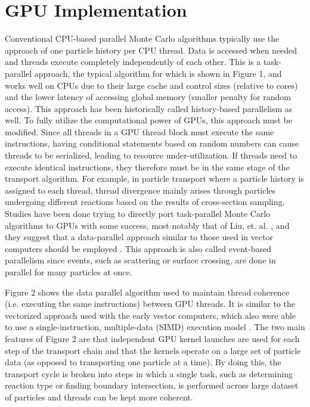 \chapter{GPU Implementation}
\label{chap:imp}

Conventional CPU-based parallel Monte Carlo algorithms typically use the approach of one particle history per CPU thread.  Data is accessed when needed and threads execute completely independently of each other.  This is a task-parallel approach, the typical algorithm for which is shown in Figure 1, and works well on CPUs due to their large cache and control sizes (relative to cores) and the lower latency of accessing global memory (smaller penalty for random access).  This approach has been historically called history-based parallelism as well.  To fully utilize the computational power of GPUs, this approach must be modified.  Since all threads in a GPU thread block must execute the same instructions, having conditional statements based on random numbers can cause threads to be serialized, leading to resource under-utilization.  If threads need to execute identical instructions, they therefore must be in the same stage of the transport algorithm.  For example, in particle transport where a particle history is assigned to each thread, thread divergence mainly arises through particles undergoing different reactions based on the results of cross-section sampling.    Studies have been done trying to directly port task-parallel Monte Carlo algorithms to GPUs with some success, most notably that of Liu, et. al. \cite{tianyu}, and they suggest that a data-parallel approach similar to those used in vector computers should be employed \cite{tianyu,vector}.  This approach is also called event-based parallelism since events, such as scattering or surface crossing, are done in parallel for many particles at once.  

Figure 2 shows the data parallel algorithm used to maintain thread coherence (i.e. executing the same instructions) between GPU threads.  It is similar to the vectorized approach used with the early vector computers, which also were able to use a single-instruction, multiple-data (SIMD) execution model \cite{vector,vujic_vector}.  The two main features of Figure 2 are that independent GPU kernel launches are used for each step of the transport chain and that the kernels operate on a large set of particle data (as opposed to transporting one particle at a time).  By doing this, the transport cycle is broken into steps in which a single task, such as determining reaction type or finding boundary intersection, is performed across large dataset of particles and threads can be kept more coherent.

